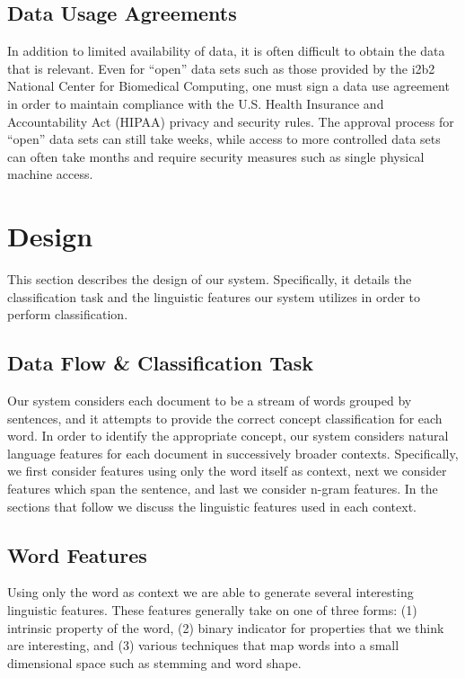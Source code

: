 \documentclass[preprint]{style}
\begin{document}
\subsection{Data Usage Agreements}
In addition to limited availability of data, it is often difficult to obtain the data that is relevant. Even for ``open'' data sets such as those provided by the i2b2 National Center for Biomedical Computing, one must sign a data use agreement in order to maintain compliance with the U.S. Health Insurance and Accountability Act (HIPAA) privacy and security rules. The approval process for ``open'' data sets can still take weeks, while access to more controlled data sets can often take months and require security measures such as single physical machine access.

\section{Design}
This section describes the design of our system. Specifically, it details the classification task and the linguistic features our system utilizes in order to perform classification.

\subsection{Data Flow \& Classification Task}
Our system considers each document to be a stream of words grouped by sentences, and it attempts to provide the correct concept classification for each word. In order to identify the appropriate concept, our system considers natural language features for each document in successively broader contexts. Specifically, we first consider features using only the word itself as context, next we consider features which span the sentence, and last we consider n-gram features. In the sections that follow we discuss the linguistic features used in each context.

\subsection{Word Features}
Using only the word as context we are able to generate several interesting linguistic features. These features generally take on one of three forms: (1) intrinsic property of the word, (2) binary indicator for properties that we think are interesting, and (3) various techniques that map words into a small dimensional space such as stemming and word shape.
\end{document}
